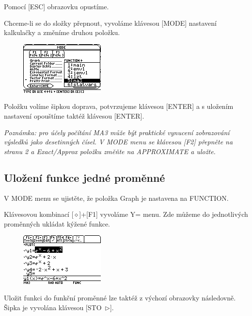 \documentclass[10pt,a4paper,float]{article}
\begin{document}
Pomocí [ESC] obrazovku opustíme.

Chceme-li se do složky přepnout, vyvoláme klávesou [MODE] nastavení kalkulačky a změníme druhou položku.

\begin{figure}[H]
	\centering
	\includegraphics[width=.5\textwidth]{img/CHANGEFOLDER}
\end{figure}

Položku volíme šipkou doprava, potvrzujeme klávesou [ENTER] a s uložením nastavení opouštíme taktéž klávesou [ENTER].

\textit{Poznámka: pro účely počítání MA3 může být praktické vynucení zobrazování výsledků jako desetinných čísel. V MODE menu se klávesou [F2] přepněte na stranu 2 a Exact/Approx položku změňte na APPROXIMATE a uložte.}

\pagebreak

\subsection{Uložení funkce jedné proměnné}
\label{ssec:ulozeni1fce}
V MODE menu se ujistěte, že položka Graph je nastavena na FUNCTION.

Klávesovou kombinací [$\diamond$]+[F1] vyvoláme Y= menu. Zde můžeme do jednotlivých proměnných ukládat kýžené funkce.

\begin{figure}[H]
	\centering
	\includegraphics[width=.5\textwidth]{img/1FUNC}
\end{figure}

Uložit funkci do funkční proměnné lze taktéž z výchozí obrazovky následovně. Šipka je vyvolána klávesou [STO~$\triangleright$].
\end{document}
